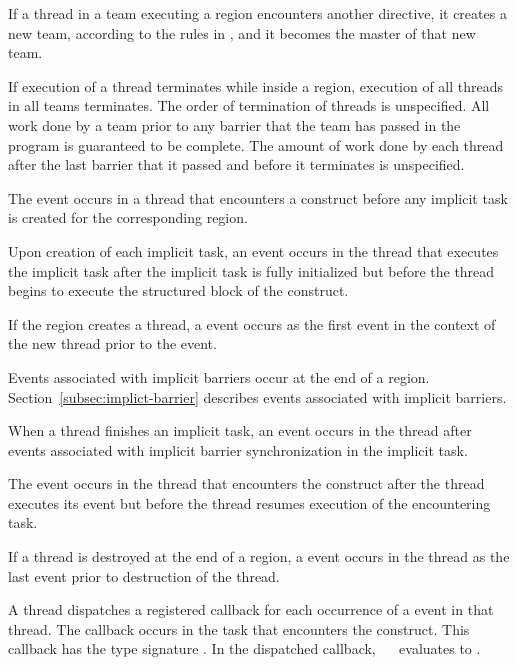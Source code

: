 If a thread in a team executing a  region encounters another 
directive, it creates a new team, according to the rules in
,
and it becomes the master of that new team.

If execution of a thread terminates while inside a  region, execution of all
threads in all teams terminates. The order of termination of threads is unspecified. All
work done by a team prior to any barrier that the team has passed in the program is
guaranteed to be complete. The amount of work done by each thread after the last
barrier that it passed and before it terminates is unspecified.

\events

The  event occurs in a thread that encounters a
 construct before any implicit task is created for the
corresponding  region.

Upon creation of each implicit task, an  event
occurs in the thread that executes the implicit task after the implicit
task is fully initialized but before the thread begins to execute the
structured block of the  construct.

If the  region creates a thread, a 
event occurs as the first event in the context of the new thread
prior to the  event.

Events associated with implicit barriers occur at the end of a
 region. Section~\ref{subsec:implict-barrier} describes events
associated with implicit barriers.

When a thread finishes an implicit task, an 
event occurs in the thread after events associated with implicit
barrier synchronization in the implicit task.

The  event occurs in the thread that encounters the
 construct after the thread executes its  
event but before the thread resumes execution of the encountering task.

If a thread is destroyed at the end of a  region, a
 event occurs in the thread as the last event prior 
to destruction of the thread.

\tools

A thread dispatches a registered 
callback for each occurrence of a  event in that
thread.  The callback occurs in the task that encounters the 
 construct.  This callback has the type signature
. In the dispatched callback, 
~\code{&}~ evaluates to .

